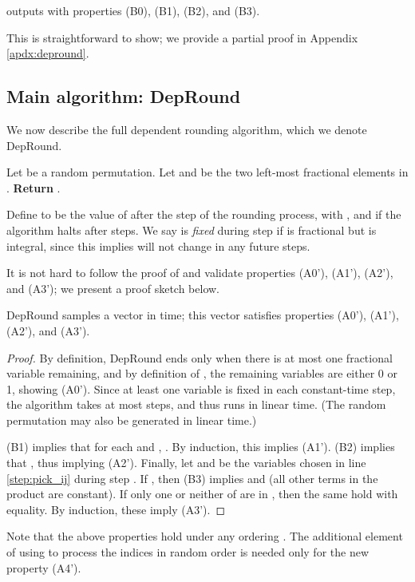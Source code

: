 \begin{lemma}\label{lemma:b-props}
 outputs  with properties (B0), (B1), (B2), and (B3).
\end{lemma}
This is straightforward to show; we provide a partial proof in Appendix \ref{apdx:depround}.

\subsection{Main algorithm: {\sc DepRound}} \label{sec:depround}
We now describe the full dependent rounding algorithm, which we denote {\sc DepRound}. 


\begin{algorithm}[h]
\caption{}
\begin{algorithmic}[1]
\STATE 
\STATE Let  be a random permutation.
\STATE Let  and  be the two left-most fractional elements in .\label{step:pick_ij}
\STATE 
\ENDWHILE
\STATE \textbf{Return} .
\end{algorithmic} 
\label{algo:A}
\end{algorithm}
Define  to be the value of  after the step  of the rounding process, with , and  if the algorithm halts after  steps. 
We say  is \emph{fixed} during step  if  is fractional but  is integral, since this implies  will not change in any future steps.

It is not hard to follow the proof of \cite{srin:level-sets} and validate properties (A0'), (A1'), (A2'), and (A3'); we present a proof sketch below. 
\begin{lemma}
{\sc DepRound} samples a vector in  time; this vector satisfies properties (A0'), (A1'), (A2'), and (A3').
\end{lemma}
\begin{proof}
By definition, {\sc DepRound} ends only when there is at most one fractional variable remaining, and by definition of , the remaining variables are either 0 or 1, showing (A0'). Since at least one variable is fixed in each constant-time step, the algorithm takes at most  steps, and thus runs in linear time. (The random permutation  may also be generated in linear time.)

(B1) implies that for each  and , . By induction, this implies (A1'). (B2) implies that , thus implying (A2'). Finally, let  and  be the variables chosen in line \ref{step:pick_ij} during step . If , then (B3) implies  and  (all other terms in the product are constant). If only one or neither of  are in , then the same hold with equality. By induction, these imply (A3').
\end{proof}
Note that the above properties hold under any ordering . The additional element of using  to process the indices in random order is needed only for the new property (A4').

